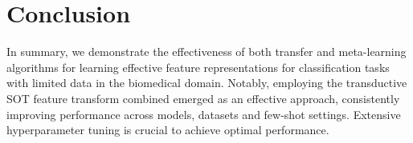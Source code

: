 \section{Conclusion}

In summary, we demonstrate the effectiveness of both transfer and meta-learning algorithms for learning effective feature representations for classification tasks with limited data in the biomedical domain. 
Notably, employing the transductive SOT feature transform combined emerged as an effective approach, consistently improving performance across models, datasets and few-shot settings. Extensive hyperparameter tuning is crucial to achieve optimal performance.